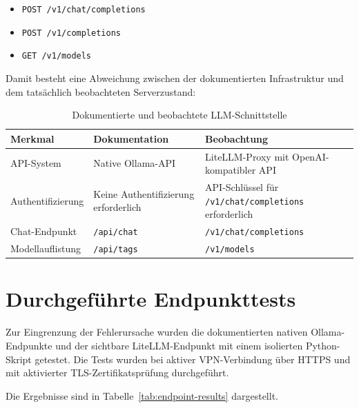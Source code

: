 \documentclass[11pt,a4paper,oneside,ngerman]{memoir}
\begin{document}
\begin{itemize}
    \item \texttt{POST /v1/chat/completions}
    \item \texttt{POST /v1/completions}
    \item \texttt{GET /v1/models}
\end{itemize}

Damit besteht eine Abweichung zwischen der dokumentierten Infrastruktur und dem tatsächlich beobachteten Serverzustand:

\begin{table}[htbp]
\centering
\caption{Dokumentierte und beobachtete LLM-Schnittstelle}
\label{tab:documented-observed-api}
\small
\begin{tabularx}{\textwidth}{@{}p{}p{}X@{}}
\toprule
\textbf{Merkmal} &
\textbf{Dokumentation} &
\textbf{Beobachtung} \\
\midrule
API-System &
Native Ollama-API &
LiteLLM-Proxy mit OpenAI-kompatibler API \\
\addlinespace
Authentifizierung &
Keine Authentifizierung erforderlich &
API-Schlüssel für \texttt{/v1/chat/completions} erforderlich \\
\addlinespace
Chat-Endpunkt &
\texttt{/api/chat} &
\texttt{/v1/chat/completions} \\
\addlinespace
Modellauflistung &
\texttt{/api/tags} &
\texttt{/v1/models} \\
\bottomrule
\end{tabularx}
\end{table}

\section{Durchgeführte Endpunkttests}

Zur Eingrenzung der Fehlerursache wurden die dokumentierten nativen Ollama-Endpunkte und der sichtbare LiteLLM-Endpunkt mit einem isolierten Python-Skript getestet. Die Tests wurden bei aktiver VPN-Verbindung über HTTPS und mit aktivierter TLS-Zertifikatsprüfung durchgeführt.

Die Ergebnisse sind in Tabelle~\ref{tab:endpoint-results} dargestellt.
\end{document}
